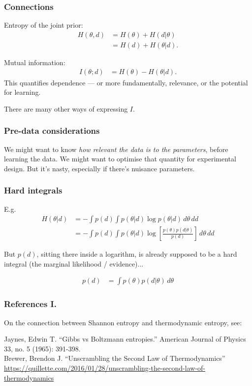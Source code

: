 \documentclass{beamer}
\begin{document}
\begin{frame}
\frametitle{Connections}

Entropy of the joint prior:
\begin{align}
H(\theta, d) &= H(\theta) + H(d | \theta) \\
                          &= H(d) + H(\theta | d).
\end{align}

Mutual information:
\begin{align}
I(\theta; d) &= H(\theta) - H(\theta | d).
\end{align}
This quantifies dependence --- or more fundamentally,
relevance, or the potential for learning.


{\tiny There are many other ways of expressing $I$.}

\end{frame}


\begin{frame}
\frametitle{Pre-data considerations}

We might want to know {\em how relevant the data is to the parameters},
before learning the data. We might want to optimise that quantity for
experimental design. But it's nasty, especially if there's nuisance
parameters.
\end{frame}


\begin{frame}
\frametitle{Hard integrals}

E.g.
\begin{align}
H(\theta|d) &= -\int p(d) \int p(\theta|d) \log p(\theta|d) \, d\theta \, dd \\
            &= -\int p(d) \int p(\theta|d)
                    \log\left[\frac{p(\theta)p(d|\theta)}{p(d)}\right] \, d\theta \, dd
\end{align}

But $p(d)$, sitting there inside a logarithm, is already supposed to be
a hard integral (the marginal likelihood / evidence)...

\begin{align}
p(d) &= \int p(\theta) p(d|\theta) \, d\theta
\end{align}

\end{frame}



\begin{frame}
\frametitle{References I.}

On the connection between Shannon entropy and thermodynamic entropy,
see: \vspace{2em}

{\tiny Jaynes, Edwin T. ``Gibbs vs Boltzmann entropies.''
American Journal of Physics 33, no. 5 (1965): 391-398. \\

Brewer, Brendon J. ``Unscrambling the Second Law of Thermodynamics''
{\color{blue}
  \url{https://quillette.com/2016/01/28/unscrambling-the-second-law-of-thermodynamics}
}
} %

\end{frame}
\end{document}
